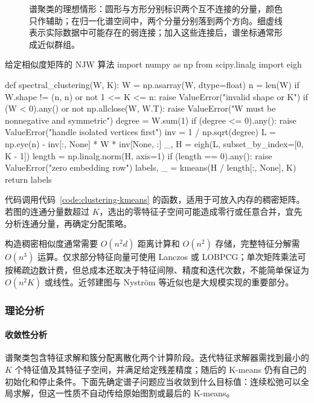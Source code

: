 \Needspace{62mm}
\begin{figure}[htbp]
 \centering
 
 \caption{谱聚类的理想情形：圆形与方形分别标识两个互不连接的分量，颜色只作辅助；在归一化谱空间中，两个分量分别落到两个方向。细虚线表示实际数据中可能存在的弱连接；加入这些连接后，谱坐标通常形成近似群组。}
 \label{fig:clustering-spectral}
\end{figure}

\begin{codeblock}[language=Python,label={code:clustering-spectral}]{给定相似度矩阵的 NJW 算法}
import numpy as np
from scipy.linalg import eigh

def spectral_clustering(W, K):
    W = np.asarray(W, dtype=float)
    n = len(W)
    if W.shape != (n, n) or not 1 <= K <= n:
        raise ValueError("invalid shape or K")
    if (W < 0).any() or not np.allclose(W, W.T):
        raise ValueError("W must be nonnegative and symmetric")
    degree = W.sum(1)
    if (degree <= 0).any():
        raise ValueError("handle isolated vertices first")
    inv = 1 / np.sqrt(degree)
    L = np.eye(n) - inv[:, None] * W * inv[None, :]
    _, H = eigh(L, subset_by_index=[0, K - 1])
    length = np.linalg.norm(H, axis=1)
    if (length == 0).any():
        raise ValueError("zero embedding row")
    labels, _ = kmeans(H / length[:, None], K)
    return labels
\end{codeblock}

代码调用代码~\ref{code:clustering-kmeans} 的函数，适用于可放入内存的稠密矩阵。若图的连通分量数超过 $K$，选出的零特征子空间可能造成零行或任意合并，宜先分析连通分量，再确定分配策略。

构造稠密相似度通常需要 $O(n^2d)$ 距离计算和 $O(n^2)$ 存储，完整特征分解需 $O(n^3)$ 运算。仅求部分特征向量可使用 Lanczos 或 LOBPCG；单次矩阵乘法可按稀疏边数计费，但总成本还取决于特征间隙、精度和迭代次数，不能简单保证为 $O(n^2K)$ 或线性。近邻建图与 Nyström 等近似也是大规模实现的重要部分。

\subsubsection{理论分析}

\paragraph{收敛性分析}
谱聚类包含特征求解和簇分配离散化两个计算阶段。迭代特征求解器需找到最小的 $K$ 个特征值及其特征子空间，并满足给定残差精度；随后的 K-means 仍有自己的初始化和停止条件。下面先确定谱子问题应当收敛到什么目标值：连续松弛可以全局求解，但这一性质不自动传给原始图割或最后的 K-means。


